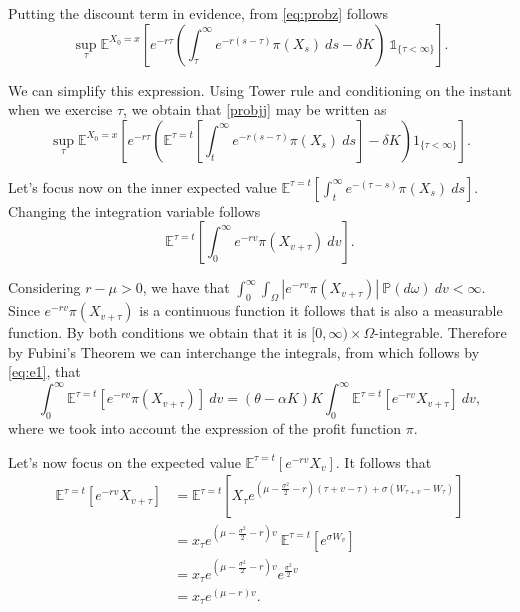 Putting the discount term in evidence, from \eqref{eq:probz} follows
\begin{equation}
\sup_\tau \mathds{E}^{X_0=x} \left[e^{-r\tau }\left( \int_\tau^\infty e^{-r(s-\tau)} \pi(X_s)\ ds -\delta K \right) \ \mathds{1}_{\{\tau<\infty\}} \right].
\label{probjj}
\end{equation}

We can simplify this expression. Using Tower rule and conditioning on the instant when we exercise $\tau$, we obtain that \eqref{probjj} may be written as
\begin{equation}
\sup_\tau \mathds{E}^{X_0=x}\left[ e^{- r\tau} \left( \mathds{E}^{\tau=t}\left[  \int_t^\infty e^{-r(s-\tau) }\pi(X_s)\ ds  \right] -\delta K\right) 1_{\{\tau<\infty\}} \right].
\label{eq:probm}
\end{equation}

Let's focus now on the inner expected value $\mathds{E}^{\tau=t}\left[  \int_t^\infty e^{-(\tau-s) }\pi(X_s) \ ds  \right]$. Changing the integration variable follows
\begin{equation}
\mathds{E}^{\tau=t}\left[  \int_0^\infty e^{-rv }\pi(X_{v+\tau})\ dv  \right].
\label{eq:e1}
\end{equation}

Considering $r-\mu>0$, we have that $ \int_0^\infty \int_\Omega    |e^{-rv }\pi(X_{v+\tau})| \ \mathds{P}(d \omega) \ dv < \infty$. Since $e^{-rv }\pi(X_{v+\tau})$ is a continuous function it follows that is also a measurable function. By both conditions we obtain that it is $[0,\infty) \times \Omega$-integrable. Therefore by Fubini's Theorem we can interchange the integrals, from which follows by \eqref{eq:e1}, that
\begin{equation}
\int_0^\infty\mathds{E}^{\tau=t}\left[   e^{-rv }\pi(X_{v+\tau}) \right]\ dv
= (\theta-\alpha K)K \int_0^\infty\mathds{E}^{\tau=t}\left[   e^{-rv } X_{v+\tau} \right]\ dv,
\label{eq:e2}
\end{equation}
where we took into account the expression of the profit function $\pi$.


Let's now focus on the expected value $\mathds{E}^{\tau=t}\left[   e^{-rv }  X_{v} \right]$.
It follows that
\begin{align}
\mathds{E}^{\tau=t}\left[   e^{-rv } X_{v+\tau} \right] 
&= \mathds{E}^{\tau=t}\left[   X_\tau e^{\left(\mu- \frac{\sigma^2}{2}-r \right) (\tau+v-\tau) + \sigma (W_{\tau+v}-W_\tau)}\right] \nonumber \\
&=x_\tau e^{\left(\mu- \frac{\sigma^2}{2}-r \right) v} \ \mathds{E}^{\tau=t}\left[ e^{\sigma W_v} \right] \nonumber \\
&= x_\tau e^{\left(\mu- \frac{\sigma^2}{2}-r \right) v} e^{ \frac{\sigma^2}{2} v} \nonumber \\
&=x_\tau e^{(\mu-r)v}.
\label{eq:e4}
\end{align}


